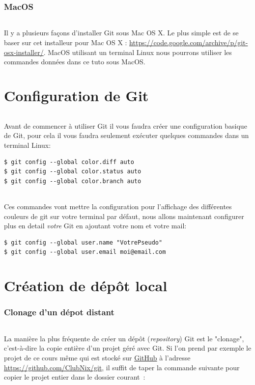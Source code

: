 \documentclass[french, a4paper, 12pt, titlepage]{article}
\begin{document}
\section{MacOS}
\paragraph{}Il y a plusieurs façons d’installer Git sous Mac OS X. Le plus simple est de se baser sur cet installeur pour Mac OS X : 
\url{https://code.google.com/archive/p/git-osx-installer/}. 
MacOS utilisant un terminal Linux nous pourrons utiliser les commandes données dans ce tuto sous MacOS.

\newpage
\part{Configuration de Git}
\paragraph{}Avant de commencer à utiliser Git il vous faudra créer une configuration basique de Git, pour cela il vous faudra seulement exécuter quelques commandes dans un terminal Linux:
\begin{lstlisting}
$ git config --global color.diff auto
$ git config --global color.status auto
$ git config --global color.branch auto
\end{lstlisting}
\paragraph{}Ces commandes vont mettre la configuration pour l'affichage des différentes couleurs de git sur votre terminal par défaut, nous allons maintenant configurer plus en detail \emph{votre} Git en ajoutant votre nom et votre mail:
\begin{lstlisting}
$ git config --global user.name "VotrePseudo"
$ git config --global user.email moi@email.com
\end{lstlisting}

\newpage
\part{Création de dépôt local}

\section{Clonage d'un dépot distant}

\paragraph{} La manière la plus fréquente de créer un dépôt
(\emph{repository}) Git est le "clonage", c'est-à-dire la copie entière d'un projet géré avec Git. Si l'on prend par exemple le projet de ce cours même qui est stocké sur \href{https://github.com}{GitHub} à l'adresse
\url{https://github.com/ClubNix/git}, il suffit de taper la commande suivante pour copier le projet entier dans le dossier courant~:
\end{document}

